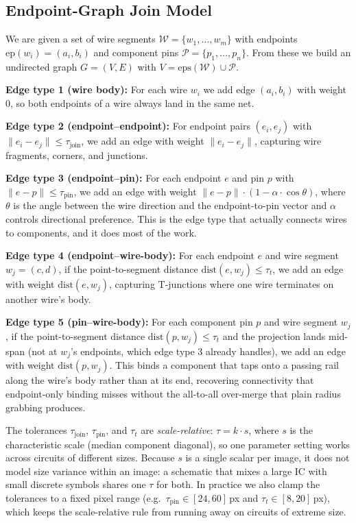 \documentclass{ieeeaccess}
\begin{document}
\subsection{Endpoint-Graph Join Model}

We are given a set of wire segments $\mathcal{W} = \{w_1, \ldots, w_m\}$ with endpoints $\text{ep}(w_i) = (a_i, b_i)$ and component pins $\mathcal{P} = \{p_1, \ldots, p_n\}$. From these we build an undirected graph $G = (V, E)$ with $V = \text{eps}(\mathcal{W}) \cup \mathcal{P}$.

\textbf{Edge type 1 (wire body):} For each wire $w_i$ we add edge $(a_i, b_i)$ with weight 0, so both endpoints of a wire always land in the same net.

\textbf{Edge type 2 (endpoint--endpoint):} For endpoint pairs $(e_i, e_j)$ with $\|e_i - e_j\| \leq \tau_{\text{join}}$, we add an edge with weight $\|e_i - e_j\|$, capturing wire fragments, corners, and junctions.

\textbf{Edge type 3 (endpoint--pin):} For each endpoint $e$ and pin $p$ with $\|e - p\| \leq \tau_{\text{pin}}$, we add an edge with weight $\|e - p\| \cdot (1 - \alpha \cdot \cos\theta)$, where $\theta$ is the angle between the wire direction and the endpoint-to-pin vector and $\alpha$ controls directional preference. This is the edge type that actually connects wires to components, and it does most of the work.

\textbf{Edge type 4 (endpoint--wire-body):} For each endpoint $e$ and wire segment $w_j = (c, d)$, if the point-to-segment distance $\text{dist}(e, w_j) \leq \tau_t$, we add an edge with weight $\text{dist}(e, w_j)$, capturing T-junctions where one wire terminates on another wire's body.

\textbf{Edge type 5 (pin--wire-body):} For each component pin $p$ and wire segment $w_j$, if the point-to-segment distance $\text{dist}(p, w_j) \leq \tau_t$ and the projection lands mid-span (not at $w_j$'s endpoints, which edge type 3 already handles), we add an edge with weight $\text{dist}(p, w_j)$. This binds a component that taps onto a passing rail along the wire's body rather than at its end, recovering connectivity that endpoint-only binding misses without the all-to-all over-merge that plain radius grabbing produces.

The tolerances $\tau_{\text{join}}$, $\tau_{\text{pin}}$, and $\tau_t$ are \emph{scale-relative}: $\tau = k \cdot s$, where $s$ is the characteristic scale (median component diagonal), so one parameter setting works across circuits of different sizes. Because $s$ is a single scalar per image, it does not model size variance within an image: a schematic that mixes a large IC with small discrete symbols shares one $\tau$ for both. In practice we also clamp the tolerances to a fixed pixel range (e.g.\ $\tau_{\text{pin}} \in [24, 60]\,$px and $\tau_t \in [8, 20]\,$px), which keeps the scale-relative rule from running away on circuits of extreme size.
\end{document}
